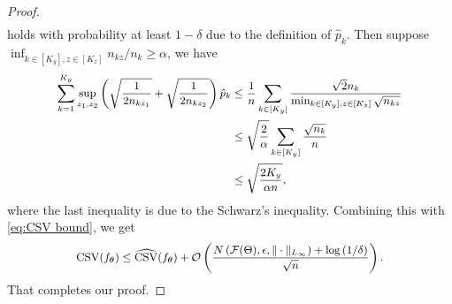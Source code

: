 \begin{proof}
\begin{equation}
\begin{aligned}
		\end{aligned}
	\end{equation}
	holds with probability at least $1 - \delta$ due to the definition of $\hat{p}_{k}$. Then suppose $\inf_{k\in[K_{y}],z\in[K_{z}]} n_{kz} / n_{k} \geq \alpha$, we have  
	\begin{equation}
		\small
		\begin{aligned}
		\sum\limits_{k = 1}^{K_{y}}\sup_{z_{1},z_{2}}\left(\sqrt{\frac{1}{2n_{kz_{1}}}} + \sqrt{\frac{1}{2n_{kz_{2}}}}\right)\hat{p}_{k} & \leq \frac{1}{n}\sum_{k\in[K_{y}]}\frac{\sqrt{2}n_{k}}{\min_{k\in[K_{y}], z\in [K_{z}]}\sqrt{n_{kz}}} \\
		& \leq \sqrt{\frac{2}{\alpha}}\sum_{k\in[K_{y}]}\frac{\sqrt{n_{k}}}{n} \\
	 	& \leq \sqrt{\frac{2K_{y}}{\alpha n}},
		\end{aligned}
	\end{equation}
	where the last inequality is due to the Schwarz's inequality. Combining this with \eqref{eq:CSV bound}, we get 
	\begin{equation}
		\small
		\mathrm{CSV}(f_{\btheta}) \leq \widehat{\rm{CSV}}(f_{\btheta}) + \cO\left(\frac{N\left(\cF(\Theta), \epsilon, \|\cdot\|_{L_{\infty}}\right) + \log{(1/\delta)}}{\sqrt{n}}\right).
	\end{equation}
	That completes our proof. 
\end{proof}
